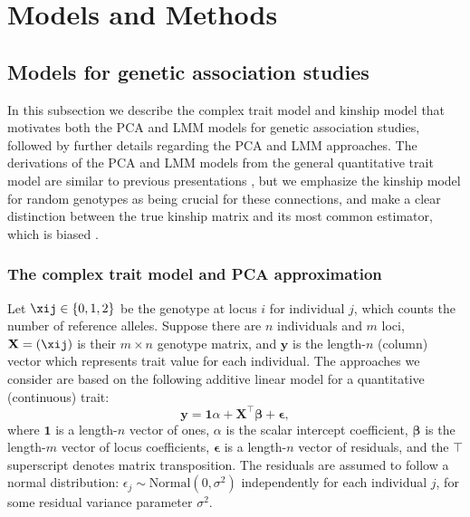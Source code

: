 \documentclass[11pt]{article}
\begin{document}

\section{Models and Methods}

\subsection{Models for genetic association studies}

In this subsection we describe the complex trait model and kinship model that motivates both the PCA and LMM models for genetic association studies, followed by further details regarding the PCA and LMM approaches.
The derivations of the PCA and LMM models from the general quantitative trait model are similar to previous presentations \citep{astle_population_2009, janss_inferences_2012, hoffman_correcting_2013}, but we emphasize the kinship model for random genotypes as being crucial for these connections, and make a clear distinction between the true kinship matrix and its most common estimator, which is biased \citep{ochoa_estimating_2021, ochoa_human}.

\subsubsection{The complex trait model and PCA approximation}

Let $\xij \in \{ 0, 1, 2 \}$ be the genotype at locus $i$ for individual $j$, which counts the number of reference alleles.
Suppose there are $n$ individuals and $m$ loci,
$\mathbf{X} = ( \xij )$ is their $m \times n$ genotype matrix, and
$\mathbf{y}$ is the length-$n$ (column) vector which represents trait value for each individual.
The approaches we consider are based on the following additive linear model for a quantitative (continuous) trait:
\begin{equation}
  \label{eq:trait}
  \mathbf{y}
  =
  \mathbf{1} \alpha + \mathbf{X}^\intercal \boldsymbol{\beta} + \boldsymbol{\epsilon}
  ,
\end{equation}
where
$\mathbf{1}$ is a length-$n$ vector of ones,
$\alpha$ is the scalar intercept coefficient,
$\boldsymbol{\beta}$ is the length-$m$ vector of locus coefficients,
$\boldsymbol{\epsilon}$ is a length-$n$ vector of residuals,
and the $\intercal$ superscript denotes matrix transposition.
The residuals are assumed to follow a normal distribution: $\epsilon_j \sim \text{Normal}(0, \sigma^2)$ independently for each individual $j$, for some residual variance parameter $\sigma^2$.
\end{document}
